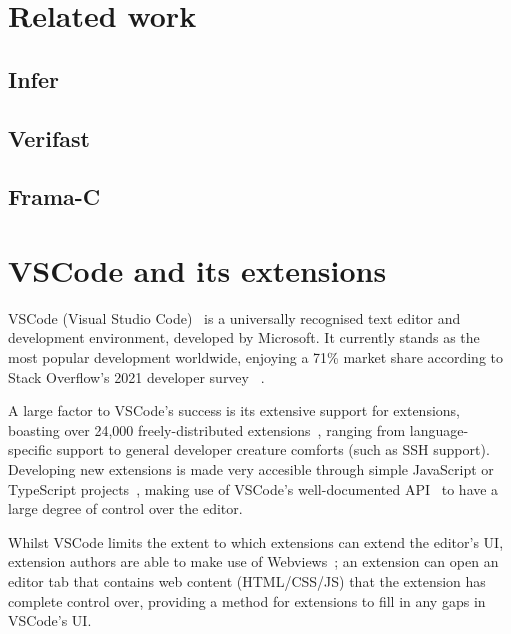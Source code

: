
\section{Related work}
\label{sec:background:related-work}

\subsection{Infer}

\subsection{Verifast}

\subsection{Frama-C}


\section{VSCode and its extensions}

VSCode (Visual Studio Code)~\cite{vscode} is a universally recognised text
editor and development environment, developed by Microsoft. It currently stands
as the most popular development worldwide, enjoying a 71\% market share
according to Stack Overflow's 2021 developer survey
~\cite{stack-overflow-survey-editors}.

A large factor to VSCode's success is its extensive support for extensions,
boasting over 24,000 freely-distributed extensions~\cite{vscode-popularity},
ranging from language-specific support to general developer creature comforts
(such as SSH support). Developing new extensions is made very accesible through
simple JavaScript or TypeScript projects~\cite{vscode-extensions-intro}, making
use of VSCode's well-documented API~\cite{vscode-api} to have a large degree of
control over the editor.

Whilst VSCode limits the extent to which extensions can extend the editor's UI,
extension authors are able to make use of Webviews~\cite{vscode-webview}; an
extension can open an editor tab that contains web content (HTML/CSS/JS) that
the extension has complete control over, providing a method for extensions to
fill in any gaps in VSCode's UI.

